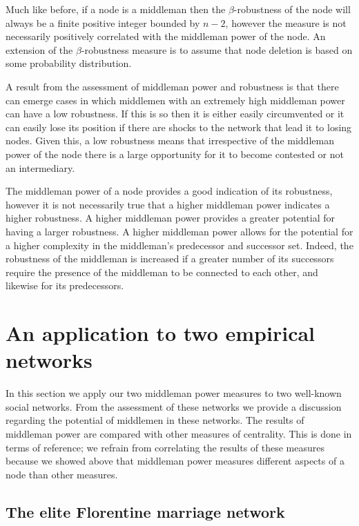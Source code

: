 Much like before, if a node is a middleman then the $\beta$-robustness of the node will always be a finite positive integer bounded by $n-2$, however the measure is not necessarily positively correlated with the middleman power of the node. An extension of the $\beta$-robustness measure is to assume that node deletion is based on some probability distribution.

\medskip \noindent A result from the assessment of middleman power and robustness is that there can emerge cases in which middlemen with an extremely high middleman power can have a low robustness. If this is so then it is either easily circumvented or it can easily lose its position if there are shocks to the network that lead it to losing nodes. Given this, a low robustness means that irrespective of the middleman power of the node there is a large opportunity for it to become contested or not an intermediary.

The middleman power of a node provides a good indication of its robustness, however it is not necessarily true that a higher middleman power indicates a higher robustness. A higher middleman power provides a greater potential for having a larger robustness. A higher middleman power allows for the potential for a higher complexity in the middleman's predecessor and successor set. Indeed, the robustness of the middleman is increased if a greater number of its successors require the presence of the middleman to be connected to each other, and likewise for its predecessors.


\section{An application to two empirical networks}

In this section we apply our two middleman power measures to two well-known social networks. From the assessment of these networks we provide a discussion regarding the potential of middlemen in these networks. The results of middleman power are compared with other measures of centrality. This is done in terms of reference; we refrain from correlating the results of these measures because we showed above that middleman power measures different aspects of a node than other measures.

\subsection{The elite Florentine marriage network}

